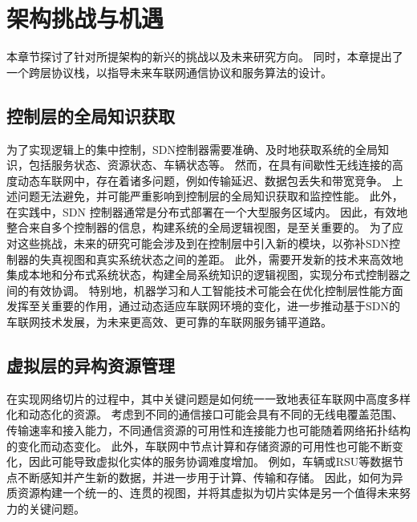 \section{架构挑战与机遇}\label{section 2-3}

本章节探讨了针对所提架构的新兴的挑战以及未来研究方向。
同时，本章提出了一个跨层协议栈，以指导未来车联网通信协议和服务算法的设计。

\subsection{控制层的全局知识获取}

为了实现逻辑上的集中控制，SDN控制器需要准确、及时地获取系统的全局知识，包括服务状态、资源状态、车辆状态等。
然而，在具有间歇性无线连接的高度动态车联网中，存在着诸多问题，例如传输延迟、数据包丢失和带宽竞争。
上述问题无法避免，并可能严重影响到控制层的全局知识获取和监控性能。
此外，在实践中，SDN 控制器通常是分布式部署在一个大型服务区域内。
因此，有效地整合来自多个控制器的信息，构建系统的全局逻辑视图，是至关重要的。
为了应对这些挑战，未来的研究可能会涉及到在控制层中引入新的模块，以弥补SDN控制器的失真视图和真实系统状态之间的差距。
此外，需要开发新的技术来高效地集成本地和分布式系统状态，构建全局系统知识的逻辑视图，实现分布式控制器之间的有效协调。
特别地，机器学习和人工智能技术可能会在优化控制层性能方面发挥至关重要的作用，通过动态适应车联网环境的变化，进一步推动基于SDN的车联网技术发展，为未来更高效、更可靠的车联网服务铺平道路。

\subsection{虚拟层的异构资源管理}

在实现网络切片的过程中，其中关键问题是如何统一一致地表征车联网中高度多样化和动态化的资源。
考虑到不同的通信接口可能会具有不同的无线电覆盖范围、传输速率和接入能力，不同通信资源的可用性和连接能力也可能随着网络拓扑结构的变化而动态变化。
此外，车联网中节点计算和存储资源的可用性也可能不断变化，因此可能导致虚拟化实体的服务协调难度增加。
例如，车辆或RSU等数据节点不断感知并产生新的数据，并进一步用于计算、传输和存储。
因此，如何为异质资源构建一个统一的、连贯的视图，并将其虚拟为切片实体是另一个值得未来努力的关键问题。

